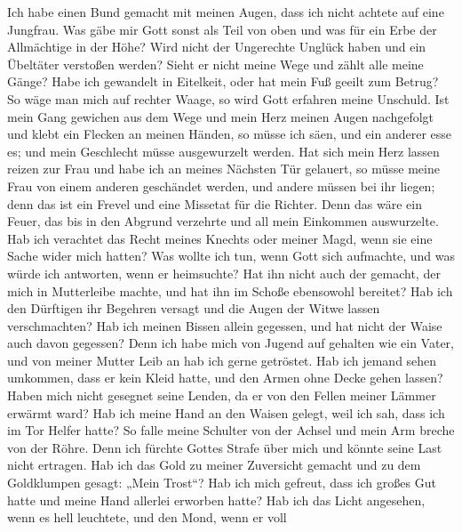  Ich habe einen Bund gemacht mit meinen Augen, dass ich
nicht achtete auf eine Jungfrau.  Was gäbe mir Gott sonst
als Teil von oben und was für ein Erbe der Allmächtige in der Höhe?
 Wird nicht der Ungerechte Unglück haben und ein Übeltäter
verstoßen werden?  Sieht er nicht meine Wege und zählt
alle meine Gänge?  Habe ich gewandelt in Eitelkeit, oder
hat mein Fuß geeilt zum Betrug?  So wäge man mich auf
rechter Waage, so wird Gott erfahren meine Unschuld.  Ist
mein Gang gewichen aus dem Wege und mein Herz meinen Augen nachgefolgt
und klebt ein Flecken an meinen Händen,  so müsse ich
säen, und ein anderer esse es; und mein Geschlecht müsse ausgewurzelt
werden.  Hat sich mein Herz lassen reizen zur Frau und
habe ich an meines Nächsten Tür gelauert,  so müsse meine
Frau von einem anderen geschändet werden, und andere müssen bei ihr
liegen;  denn das ist ein Frevel und eine Missetat für
die Richter.  Denn das wäre ein Feuer, das bis in den
Abgrund verzehrte und all mein Einkommen auswurzelte. 
Hab ich verachtet das Recht meines Knechts oder meiner Magd, wenn sie
eine Sache wider mich hatten?  Was wollte ich tun, wenn
Gott sich aufmachte, und was würde ich antworten, wenn er heimsuchte?
 Hat ihn nicht auch der gemacht, der mich in Mutterleibe
machte, und hat ihn im Schoße ebensowohl bereitet?  Hab
ich den Dürftigen ihr Begehren versagt und die Augen der Witwe lassen
verschmachten?  Hab ich meinen Bissen allein gegessen,
und hat nicht der Waise auch davon gegessen?  Denn ich
habe mich von Jugend auf gehalten wie ein Vater, und von meiner Mutter
Leib an hab ich gerne getröstet.  Hab ich jemand sehen
umkommen, dass er kein Kleid hatte, und den Armen ohne Decke gehen
lassen?  Haben mich nicht gesegnet seine Lenden, da er
von den Fellen meiner Lämmer erwärmt ward?  Hab ich meine
Hand an den Waisen gelegt, weil ich sah, dass ich im Tor Helfer hatte?
 So falle meine Schulter von der Achsel und mein Arm
breche von der Röhre.  Denn ich fürchte Gottes Strafe
über mich und könnte seine Last nicht ertragen.  Hab ich
das Gold zu meiner Zuversicht gemacht und zu dem Goldklumpen gesagt:
„Mein Trost``?  Hab ich mich gefreut, dass ich großes Gut
hatte und meine Hand allerlei erworben hatte?  Hab ich
das Licht angesehen, wenn es hell leuchtete, und den Mond, wenn er voll
